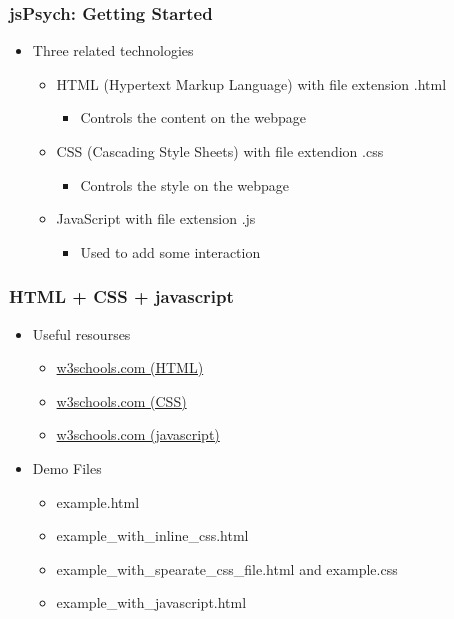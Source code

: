 \documentclass[t]{beamer}
\begin{document}
\begin{frame}[fragile]
    \frametitle{jsPsych: Getting Started}
    \begin{itemize}
        \item Three related technologies 
            \begin{itemize}
                \item HTML (Hypertext Markup Language) with file extension .html 
                    \begin{itemize}
                        \item Controls the content on the webpage
                    \end{itemize}
                \item CSS (Cascading Style Sheets) with file extendion .css
                    \begin{itemize}
                        \item Controls the style on the webpage
                    \end{itemize}
                \item JavaScript with file extension .js
                    \begin{itemize}
                        \item Used to add some interaction
                    \end{itemize}
            \end{itemize}
    \end{itemize}
\end{frame}


\begin{frame}[fragile]
    \frametitle{HTML + CSS + javascript}
    \begin{itemize}
        \item Useful resourses
            \begin{itemize}
                \item \href{https://www.w3schools.com/html/default.asp}{w3schools.com (HTML)}
                \item \href{https://www.w3schools.com/css/default.asp}{w3schools.com (CSS)}
                \item \href{https://www.w3schools.com/js/DEFAULT.asp}{w3schools.com (javascript)}
            \end{itemize}
        \item Demo Files
            \begin{itemize}
                \item example.html
                \item example\_with\_inline\_css.html
                \item example\_with\_spearate\_css\_file.html and example.css
                \item example\_with\_javascript.html
            \end{itemize}
    \end{itemize}
\end{frame}
\end{document}

